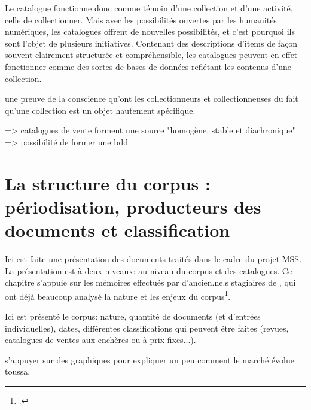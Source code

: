 Le catalogue fonctionne donc comme témoin d'une collection et d'une activité, celle de collectionner. Mais avec les possibilités ouvertes par les humanités numériques, les catalogues offrent de nouvelles possibilités, et c'est pourquoi ils sont l'objet de plusieurs initiatives. Contenant des descriptions d'items de façon souvent clairement structurée et compréhensible, les catalogues peuvent en effet fonctionner comme des sortes de bases de données reflétant les contenus d'une collection.

une preuve de la conscience qu'ont les collectionneurs et collectionneuses du fait qu'une collection est un objet hautement spécifique.

=> catalogues de vente forment une source "homogène, stable et diachronique"
=> possibilité de former une bdd


\section{La structure du corpus : périodisation, producteurs des documents et classification}
Ici est faite une présentation des documents traités dans le cadre du projet MSS. La présentation est à deux niveaux: au niveau du corpus et des catalogues. Ce chapitre s'appuie sur les mémoires effectués par d'ancien.ne.s stagiaires de \ktb{}, qui ont déjà beaucoup analysé la nature et les enjeux du corpus\footcite{rondeau_du_noyer_encoder_2019, corbieres_du_2020, janes_du_2021}.

Ici est présenté le corpus: nature, quantité de documents (et d'entrées individuelles), dates, différentes classifications qui peuvent être faites (revues, catalogues de ventes aux enchères ou à prix fixes...).

s'appuyer sur des graphiques pour expliquer un peu comment le marché évolue toussa.

